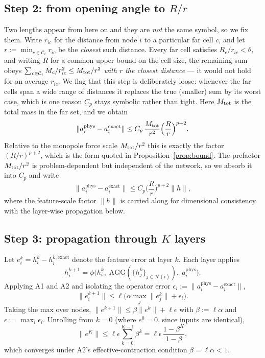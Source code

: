 \subsection{Step 2: from opening angle to $R/r$}
Two lengths appear from here on and they are \emph{not} the same symbol, so we fix them. Write
$r_{ic}$ for the distance from node $i$ to a particular far cell $c$, and let
$r:=\min_{c\in\mathcal C_i} r_{ic}$ be the \emph{closest} such distance. Every far cell
satisfies $R_c/r_{ic}<\theta$, and writing $R$ for a common upper bound on the cell size, the
remaining sum obeys $\sum_{c\in\mathcal{C}_i}M_c/r_{ic}^{2}\le M_{\rm tot}/r^{2}$
\emph{with $r$ the closest distance} --- it would not hold for an average $r_{ic}$. We flag that
this step is deliberately loose: whenever the far cells span a wide range of distances it
replaces the true (smaller) sum by its worst case, which is one reason $C_p$ stays symbolic
rather than tight. Here $M_{\rm tot}$ is the total mass in the far set, and we obtain
\begin{equation}
\|a_i^{\mathrm{phys}}-a_i^{\mathrm{exact}}\|
\le C_p\,\frac{M_{\rm tot}}{r^{2}}\Big(\frac{R}{r}\Big)^{p+2}.
\label{eq:step2}
\end{equation}
Relative to the monopole force scale $M_{\rm tot}/r^{2}$ this is exactly the factor
$(R/r)^{p+2}$, which is the form quoted in Proposition~\ref{prop:bound}. The prefactor $M_{\rm tot}/r^{2}$ is
problem-dependent but independent of the network, so we absorb it into $C_p$ and write
\begin{equation}
\|a_i^{\mathrm{phys}}-a_i^{\mathrm{exact}}\|\le C_p\Big(\frac{R}{r}\Big)^{p+2}\|h\|,
\label{eq:step2b}
\end{equation}
where the feature-scale factor $\|h\|$ is carried along for dimensional consistency with the
layer-wise propagation below.

\subsection{Step 3: propagation through $K$ layers}
Let $e_i^k=h_i^k-h_i^{k,\mathrm{exact}}$ denote the feature error at layer $k$. Each layer
applies
\begin{equation}
h_i^{k+1}=\phi\big(h_i^k,\;\mathrm{AGG}(\{h_j^k\}_{j\in\mathcal{N}(i)}),\;a_i^{\mathrm{phys}}\big).
\end{equation}
Applying A1 and A2 and isolating the operator error
$\epsilon_i:=\|a_i^{\mathrm{phys}}-a_i^{\mathrm{exact}}\|$,
\begin{equation}
\|e_i^{k+1}\|\le\ell\big(\alpha\max_j\|e_j^k\|+\epsilon_i\big).
\label{eq:step3a}
\end{equation}
Taking the max over nodes, $\|e^{k+1}\|\le\beta\|e^k\|+\ell\epsilon$ with $\beta:=\ell\alpha$
and $\epsilon:=\max_i\epsilon_i$. Unrolling from $k=0$ (where $e^0=0$, since inputs are
identical),
\begin{equation}
\|e^K\|\le\ell\epsilon\sum_{k=0}^{K-1}\beta^k
=\ell\epsilon\,\frac{1-\beta^K}{1-\beta},
\label{eq:step3b}
\end{equation}
which converges under A2's effective-contraction condition $\beta=\ell\alpha<1$.


